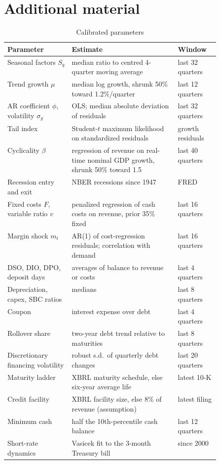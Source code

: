 \documentclass[11pt]{article}
\begin{document}
\appendix
\section{Additional material}

\begin{table}[h]
\centering\scriptsize
\caption{Calibrated parameters}
\label{tab:params}
\begin{tabular}{lp{0.5\linewidth}l}
\toprule
Parameter & Estimate & Window \\
\midrule
Seasonal factors $S_q$ & median ratio to centred 4-quarter moving average & last 32 quarters \\
Trend growth $\mu$ & median log growth, shrunk 50\% toward 1.2\%/quarter & last 12 quarters \\
AR coefficient $\phi$, volatility $\sigma_g$ & OLS; median absolute deviation of residuals & last 32 quarters \\
Tail index & Student-$t$ maximum likelihood on standardized residuals & growth residuals \\
Cyclicality $\beta$ & regression of revenue on real-time nominal GDP growth, shrunk 50\% toward 1.5 & last 40 quarters \\
Recession entry and exit & NBER recessions since 1947 & FRED \\
Fixed costs $F$, variable ratio $v$ & penalized regression of cash costs on revenue, prior 35\% fixed & last 16 quarters \\
Margin shock $m_t$ & AR(1) of cost-regression residuals; correlation with demand & last 16 quarters \\
DSO, DIO, DPO, deposit days & averages of balance to revenue or costs & last 4 quarters \\
Depreciation, capex, SBC ratios & medians & last 8 quarters \\
Coupon & interest expense over debt & last 4 quarters \\
Rollover share & two-year debt trend relative to maturities & last 8 quarters \\
Discretionary financing volatility & robust s.d.\ of quarterly debt changes & last 20 quarters \\
Maturity ladder & XBRL maturity schedule, else six-year average life & latest 10-K \\
Credit facility & XBRL facility size, else 8\% of revenue (assumption) & latest filing \\
Minimum cash & half the 10th-percentile cash balance & last 12 quarters \\
Short-rate dynamics & Vasicek fit to the 3-month Treasury bill & since 2000 \\
\bottomrule
\end{tabular}
\end{table}
\end{document}
